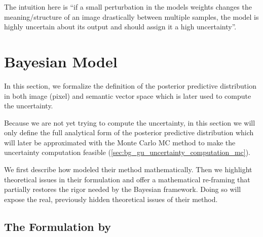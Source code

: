 \begin{tcolorbox}[colback=gray!10!white,colframe=gray!50!black,sharp corners]
The intuition here is ``if a small perturbation in the models weights changes the meaning/structure of an image drastically between multiple samples, the model is highly uncertain about its output and should assign it a high uncertainty''.
\end{tcolorbox}

\section{Bayesian Model}
\label{sec:bayesian_model}

In this section, we formalize the definition of the posterior predictive distribution in both image (pixel) and semantic vector space which is later used to compute the uncertainty. 

\begin{tcolorbox}[colback=blue!10!white,colframe=blue!50!black,sharp corners]
Because we are not yet trying to compute the uncertainty, in this section we will only define the full analytical form of the posterior predictive distribution which will later be approximated with the Monte Carlo \acs{MC} method to make the uncertainty computation feasible (\autoref{sec:bg_gu_uncertainty_computation_mc}).
\end{tcolorbox}

We first describe how \cite{jazbec_generative_2025} modeled their method mathematically. Then we highlight theoretical issues in their formulation and offer a mathematical re-framing that partially restores the rigor needed by the Bayesian framework. Doing so will expose the real, previously hidden theoretical issues of their method.


\subsection{The Formulation by \cite{jazbec_generative_2025}}

